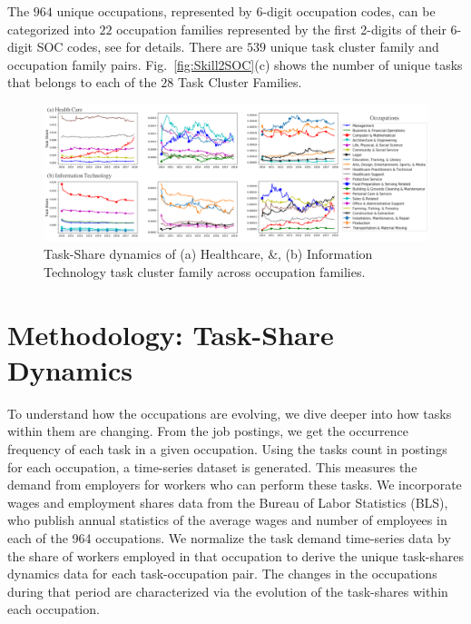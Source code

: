 \documentclass[letterpaper]{article} %
\begin{document}
The $964$ unique occupations, represented by 6-digit occupation codes, can be categorized into $22$ occupation families represented by the first 2-digits of their 6-digit SOC codes, see \cite{fleming2019future} for details. There are $539$ unique task cluster family and occupation family pairs. Fig.~\ref{fig:Skill2SOC}(c) shows the number of unique tasks that belongs to each of the $28$ Task Cluster Families.
\begin{figure}[t]
\centering
  \includegraphics[width=0.95\linewidth]{combined_health_IT.png}
  \caption{Task-Share dynamics of (a) Healthcare, \&, (b) Information Technology task cluster family across occupation families.}
  \label{fig:SCF_health_IT}
\end{figure}

\section{Methodology: Task-Share Dynamics}
\label{sec:methods}
To understand how the occupations are evolving, we dive deeper into how tasks within them are changing. From the job postings, we get the occurrence frequency of each task in a given occupation. Using the tasks count in postings for each occupation, a time-series dataset is generated. This measures the demand from employers for workers who can perform these tasks. We incorporate wages and employment shares data from the Bureau of Labor Statistics (BLS), who publish annual statistics of the average wages and number of employees in each of the 964 occupations. We normalize the task demand time-series data by the share of workers employed in that occupation to derive the unique task-shares dynamics data for each task-occupation pair. The changes in the occupations during that period are characterized via the evolution of the task-shares within each occupation.
\end{document}
